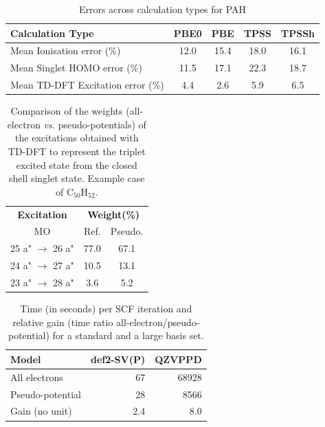 \documentclass[12pt]{article}
\begin{document}
\newpage

\begin{table}[h]
\caption{Errors across calculation types for PAH}
\begin{tabular}{|l |c |c |c |c |}
\hline
\textbf{Calculation Type} & \textbf{PBE0} & \textbf{PBE} & \textbf{TPSS} & \textbf{TPSSh} \\
\hline
Mean Ionisation  error (\%) & 12.0 & 15.4 & 18.0 & 16.1 \\\hline
Mean Singlet HOMO  error (\%) & 11.5 & 17.1 & 22.3 & 18.7 \\\hline
Mean TD-DFT Excitation error (\%) & 4.4 & 2.6 & 5.9 & 6.5 \\
\hline
\end{tabular}
\label{table:ring_system_errors}
\end{table}

\newpage
\begin{table}
\caption{\label{tab:coef}Comparison of the weights (all-electron \emph{vs.} pseudo-potentials)
of the excitations obtained with TD-DFT
to represent the triplet excited state from the closed shell singlet state.
Example case of C$_{50}$H$_{52}$.}
\begin{tabular}{|c |c |c |c|}
\hline
\multicolumn{2}{|c|}{\textbf{Excitation}} & \multicolumn{2}{c|}{\textbf{Weight(\%)}}\\
\multicolumn{2}{|c|}{MO} & Ref. & Pseudo.\\
\hline
\multicolumn{2}{|c|}{25 a" \(\rightarrow\) 26 a"} & 77.0 &   67.1  \\\hline
\multicolumn{2}{|c|}{24 a" \(\rightarrow\) 27 a"} & 10.5 &   13.1  \\\hline
\multicolumn{2}{|c|}{23 a" \(\rightarrow\) 28 a"} & 3.6  &    5.2  \\
\hline
\end{tabular}
\end{table}

\begin{table}[ht]
\caption{\label{tab:time}Time (in seconds) per SCF iteration and relative
gain (time ratio all-electron/pseudo-potential) for a standard and a large basis set.} 
\begin{tabular}{|l|r|r|}
\hline
\textbf{Model}            & \textbf{def2-SV(P)} & \textbf{QZVPPD} \\
\hline
All electrons    &        67 & 68928 \\\hline
Pseudo-potential &        28 &  8566 \\\hline
Gain (no unit)   &       2.4 &   8.0 \\
\hline
\end{tabular}
\end{table}
\end{document}

